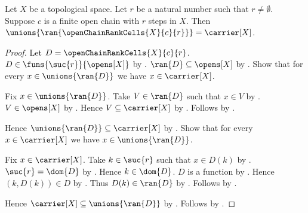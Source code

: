 \begin{corollary}\label{open_chain_rank_cells_cover}
    Let $X$ be a topological space.
    Let $r$ be a natural number such that $r\neq\emptyset$.
    Suppose $c$ is a finite open chain with $r$ steps in $X$.
    Then
        $\unions{\ran{\openChainRankCells{X}{c}{r}}}
            =\carrier[X]$.
\end{corollary}
\begin{proof}
    Let $D=\openChainRankCells{X}{c}{r}$.
    $D\in\funs{\suc{r}}{\opens[X]}$
        by .
    $\ran{D}\subseteq\opens[X]$ by .
    Show that for every $x\in\unions{\ran{D}}$ we have
        $x\in\carrier[X]$.
    \begin{subproof}
        Fix $x\in\unions{\ran{D}}$.
        Take $V\in\ran{D}$ such that $x\in V$
            by .
        $V\in\opens[X]$ by .
        Hence $V\subseteq\carrier[X]$
            by .
        Follows by .
    \end{subproof}
    Hence $\unions{\ran{D}}\subseteq\carrier[X]$
        by .
    Show that for every $x\in\carrier[X]$ we have
        $x\in\unions{\ran{D}}$.
    \begin{subproof}
        Fix $x\in\carrier[X]$.
        Take $k\in\suc{r}$ such that $x\in D(k)$
            by .
        $\suc{r}=\dom{D}$ by .
        Hence $k\in\dom{D}$.
        $D$ is a function by .
        Hence $(k,D(k))\in D$ by .
        Thus $D(k)\in\ran{D}$ by .
        Follows by .
    \end{subproof}
    Hence $\carrier[X]\subseteq\unions{\ran{D}}$
        by .
    Follows by .
\end{proof}
